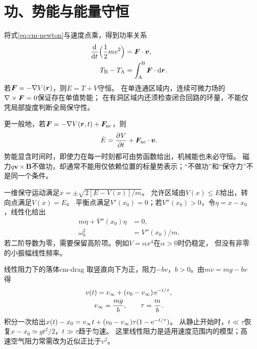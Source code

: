 \section{功、势能与能量守恒}
将式\eqref{eq:cm-newton}与速度点乘，得到功率关系
\begin{subequations}
 \begin{align}
  \frac{\mathop{}\!\mathrm{d}^{}}{\mathrm{d}{t}^{}}\Bigl(\frac12m v^2\Bigr) &= \bm F \cdot \bm v,\\
  T_{\mathrm B} - T_{\mathrm A} &= \int_{\mathrm A}^{\mathrm B}\bm F \cdot \mathop{}\!\mathrm{d}\bm r.
 \end{align}
\end{subequations}
若$\bm F = -\nabla V(\bm r)$，则$E = T + V$守恒。
在单连通区域内，连续可微力场的$\nabla\times\bm F = 0$保证存在单值势能；
在有洞区域内还须检查闭合回路的环量，不能仅凭局部旋度判断全局保守性。

更一般地，若$\bm F = -\nabla V(\bm r,t) + \bm F_{\mathrm{nc}}$，则
\begin{equation}
 \dot E = \frac{\partial^{}V}{\partial{t}^{}} + \bm F_{\mathrm{nc}} \cdot \bm v.
 \label{eq:cm-energy-work}
\end{equation}
势能显含时间时，即使力在每一时刻都可由势函数给出，机械能也未必守恒。
磁力$q\bm v \times \bm B$不做功，却通常不能用仅依赖位置的标量势表示；“不做功”和“保守力”不是同一个条件。

一维保守运动满足$\dot x = \pm\sqrt{2[E - V(x)]/m}$。
允许区域由$V(x) \leq E$给出，转向点满足$V(x) = E$。
平衡点满足$V'(x_0) = 0$；若$V''(x_0) > 0$，令$\eta = x - x_0$，线性化给出
\begin{subequations}
 \begin{align}
  m\ddot\eta + V''(x_0)\eta &= 0,\\
  \omega_0^2 &= V''(x_0)/m.
 \end{align}
\end{subequations}
若二阶导数为零，需要保留高阶项。例如$V = \alpha x^4$在$\alpha > 0$时仍稳定，
但没有非零的小振幅线性频率。

\begin{example}{线性阻力下的落体}{cm-drag}
取竖直向下为正，阻力$-bv$，$b > 0$。由$m\dot v = mg - bv$得
\begin{subequations}
 \begin{gather}
  v(t) = v_\infty + (v_0 - v_\infty)\mathop{}\!\mathrm{e}^{-t/\tau},\\
  v_\infty = \frac{mg}{b},\qquad \tau = \frac mb.
 \end{gather}
\end{subequations}
积分一次给出$x(t) - x_0 = v_\infty t + (v_0 - v_\infty)\tau(1 - \mathop{}\!\mathrm{e}^{-t/\tau})$。
从静止开始时，$t \ll \tau$恢复$x - x_0 \simeq gt^2/2$，$t \gg \tau$趋于匀速。
这里线性阻力是适用速度范围内的模型；高速空气阻力常需改为近似正比于$v^2$。
\end{example}

